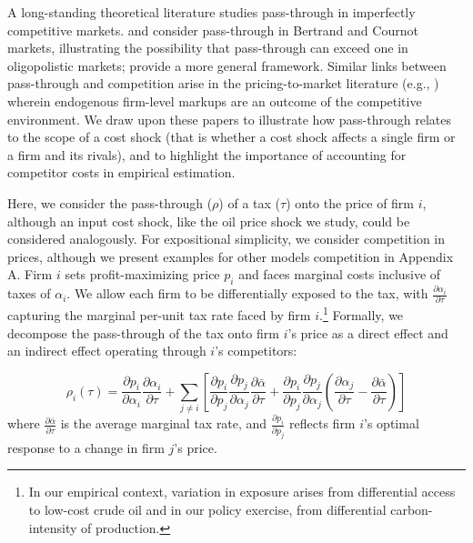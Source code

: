 \documentclass[12pt]{article}
\begin{document}
A long-standing theoretical literature studies pass-through in imperfectly competitive markets.  \citet{bulow_note_1983} and \citet{fevrier_idiosyncratic_2004} consider pass-through in Bertrand and Cournot markets, illustrating the possibility that pass-through can exceed one in oligopolistic markets; \citet{weyl_pass-through_2013} provide a more general framework.  Similar links between pass-through and competition arise in the pricing-to-market literature (e.g.,  \citet{bernard2003plants,atkeson2008pricing,de2015understanding, amiti2018international}) wherein endogenous firm-level markups are an outcome of the competitive environment.  We draw upon these papers to illustrate how pass-through relates to the scope of a cost shock (that is whether a cost shock affects a single firm or a firm and its rivals), and to highlight the importance of accounting for competitor costs in empirical estimation.

Here, we consider the pass-through ($\rho$) of a tax ($\tau$) onto the price of firm $i$, although an input cost shock, like the oil price shock we study, could be considered analogously.  For expositional simplicity, we consider competition in prices, although we present examples for other models competition in Appendix A.  Firm $i$ sets profit-maximizing price $p_i$ and faces marginal costs inclusive of taxes of $\alpha_i$. We allow each firm to be differentially exposed to the tax, with $\frac{\partial \alpha_i}{\partial \tau}$ capturing the marginal per-unit tax rate faced by firm $i$.\footnote{In our empirical context, variation in exposure arises from differential access to low-cost crude oil and in our policy exercise, from differential carbon-intensity of production.}  Formally, we decompose the pass-through of the tax onto firm $i$'s price as a direct effect and an indirect effect operating through $i$'s competitors:

\begin{equation}
\rho_i(\tau)=\frac{\partial p_i}{\partial\alpha_i}\frac{\partial \alpha_i}{\partial \tau} + \sum_{j \neq i} \left[\frac{\partial p_i}{\partial p_j} \frac{\partial p_j}{\partial\alpha_j}\frac{\partial\bar{\alpha}}{\partial \tau}+\frac{\partial p_i}{\partial p_j}\frac{\partial p_j}{\partial\alpha_j}(\frac{\partial\alpha_j}{\partial \tau} - \frac{\partial\bar{\alpha}}{\partial \tau})\right]
\label{eq: MS_passthrough}
\end{equation}
where $\frac{\partial \bar{\alpha}}{\partial \tau}$ is the average marginal tax rate, and $\frac{\partial p_i}{\partial p_j}$ reflects firm $i$'s optimal response to a change in firm $j$'s price.
\end{document}
